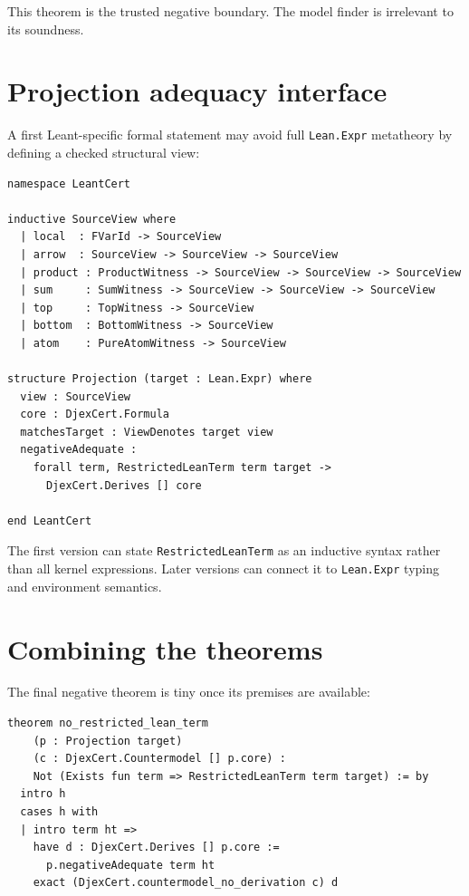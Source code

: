 \documentclass[11pt,letterpaper,openany]{report}
\theoremstyle{definition}
\theoremstyle{remark}
\newcommand{\code}[1]{\texttt{#1}}
\begin{document}
This theorem is the trusted negative boundary. The model finder is irrelevant to its soundness.

\section{Projection adequacy interface}

A first Leant-specific formal statement may avoid full \code{Lean.Expr} metatheory by defining a checked structural view:

\begin{lstlisting}[language=LeanFour,caption={Restricted structural source view.}]
namespace LeantCert

inductive SourceView where
  | local  : FVarId -> SourceView
  | arrow  : SourceView -> SourceView -> SourceView
  | product : ProductWitness -> SourceView -> SourceView -> SourceView
  | sum     : SumWitness -> SourceView -> SourceView -> SourceView
  | top     : TopWitness -> SourceView
  | bottom  : BottomWitness -> SourceView
  | atom    : PureAtomWitness -> SourceView

structure Projection (target : Lean.Expr) where
  view : SourceView
  core : DjexCert.Formula
  matchesTarget : ViewDenotes target view
  negativeAdequate :
    forall term, RestrictedLeanTerm term target ->
      DjexCert.Derives [] core

end LeantCert
\end{lstlisting}

The first version can state \code{RestrictedLeanTerm} as an inductive syntax rather than all kernel expressions. Later versions can connect it to \code{Lean.Expr} typing and environment semantics.

\section{Combining the theorems}

The final negative theorem is tiny once its premises are available:

\begin{lstlisting}[language=LeanFour,caption={The lifted negative theorem.}]
theorem no_restricted_lean_term
    (p : Projection target)
    (c : DjexCert.Countermodel [] p.core) :
    Not (Exists fun term => RestrictedLeanTerm term target) := by
  intro h
  cases h with
  | intro term ht =>
    have d : DjexCert.Derives [] p.core :=
      p.negativeAdequate term ht
    exact (DjexCert.countermodel_no_derivation c) d
\end{lstlisting}
\end{document}

